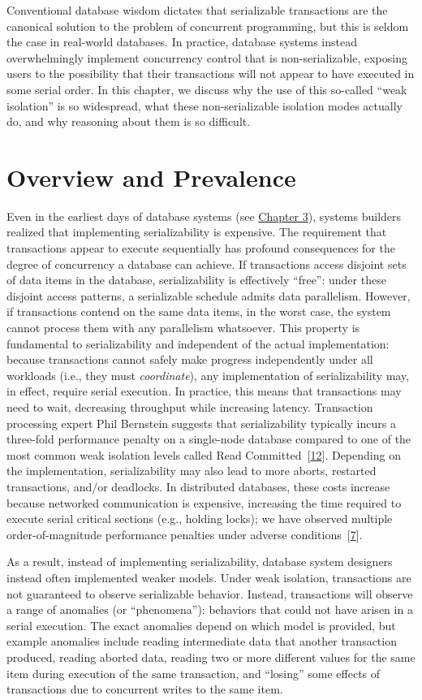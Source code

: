 \documentclass[b5paper,11pt,twoside,openright]{book}
\newcommand\Section[2]{
  \hypertarget{#1}{
    \section{#2}\label{#1}
  }
}
\begin{document}
Conventional database wisdom dictates that serializable transactions are
the canonical solution to the problem of concurrent programming, but
this is seldom the case in real-world databases. In practice, database
systems instead overwhelmingly implement concurrency control that is
non-serializable, exposing users to the possibility that their
transactions will not appear to have executed in some serial order. In
this chapter, we discuss why the use of this so-called ``weak
isolation'' is so widespread, what these non-serializable isolation
modes actually do, and why reasoning about them is so difficult.

\Section{overview-and-prevalence}{%
Overview and Prevalence
}

Even in the earliest days of database systems (see
\hyperref[ch3-techniques]{Chapter 3}), systems builders realized that
implementing serializability is expensive. The requirement that
transactions appear to execute sequentially has profound consequences
for the degree of concurrency a database can achieve. If transactions
access disjoint sets of data items in the database, serializability is
effectively ``free'': under these disjoint access patterns, a
serializable schedule admits data parallelism. However, if transactions
contend on the same data items, in the worst case, the system cannot
process them with any parallelism whatsoever. This property is
fundamental to serializability and independent of the actual
implementation: because transactions cannot safely make progress
independently under all workloads (i.e., they must \emph{coordinate}),
any implementation of serializability may, in effect, require serial
execution. In practice, this means that transactions may need to wait,
decreasing throughput while increasing latency. Transaction processing
expert Phil Bernstein suggests that serializability typically incurs a
three-fold performance penalty on a single-node database compared to one
of the most common weak isolation levels called Read
Committed~{{[}\protect\hyperlink{ref-bernstein-tutorial}{12}{]}}.
Depending on the implementation, serializability may also lead to more
aborts, restarted transactions, and/or deadlocks. In distributed
databases, these costs increase because networked communication is
expensive, increasing the time required to execute serial critical
sections (e.g., holding locks); we have observed multiple
order-of-magnitude performance penalties under adverse
conditions~{{[}\protect\hyperlink{ref-coord-avoid}{7}{]}}.

As a result, instead of implementing serializability, database system
designers instead often implemented weaker models. Under weak isolation,
transactions are not guaranteed to observe serializable behavior.
Instead, transactions will observe a range of anomalies (or
``phenomena''): behaviors that could not have arisen in a serial
execution. The exact anomalies depend on which model is provided, but
example anomalies include reading intermediate data that another
transaction produced, reading aborted data, reading two or more
different values for the same item during execution of the same
transaction, and ``losing'' some effects of transactions due to
concurrent writes to the same item.
\end{document}
